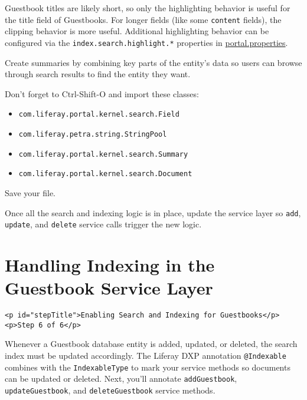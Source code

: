 Guestbook titles are likely short, so only the highlighting behavior is
useful for the title field of Guestbooks. For longer fields (like some
\texttt{content} fields), the clipping behavior is more useful.
Additional highlighting behavior can be configured via the
\texttt{index.search.highlight.*} properties in
\href{https://docs.liferay.com/portal/7.2-latest/propertiesdoc/portal.properties.html\#Lucene\%20Search}{portal.properties}.

Create summaries by combining key parts of the entity's data so users
can browse through search results to find the entity they want.

Don't forget to Ctrl-Shift-O and import these classes:

\begin{itemize}
\tightlist
\item
  \texttt{com.liferay.portal.kernel.search.Field}
\item
  \texttt{com.liferay.petra.string.StringPool}
\item
  \texttt{com.liferay.portal.kernel.search.Summary}
\item
  \texttt{com.liferay.portal.kernel.search.Document}
\end{itemize}

Save your file.

Once all the search and indexing logic is in place, update the service
layer so \texttt{add}, \texttt{update}, and \texttt{delete} service
calls trigger the new logic.

\chapter{Handling Indexing in the Guestbook Service
Layer}\label{handling-indexing-in-the-guestbook-service-layer}

\begin{verbatim}
<p id="stepTitle">Enabling Search and Indexing for Guestbooks</p><p>Step 6 of 6</p>
\end{verbatim}

Whenever a Guestbook database entity is added, updated, or deleted, the
search index must be updated accordingly. The Liferay DXP annotation
\texttt{@Indexable} combines with the \texttt{IndexableType} to mark
your service methods so documents can be updated or deleted. Next,
you'll annotate \texttt{addGuestbook}, \texttt{updateGuestbook}, and
\texttt{deleteGuestbook} service methods.

